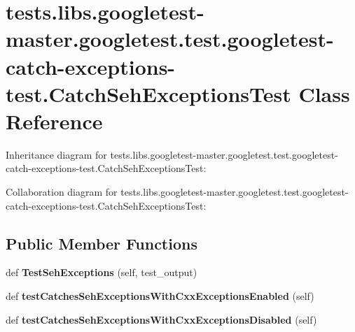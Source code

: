 \hypertarget{classtests_1_1libs_1_1googletest-master_1_1googletest_1_1test_1_1googletest-catch-exceptions-test_1_1CatchSehExceptionsTest}{}\section{tests.\+libs.\+googletest-\/master.googletest.\+test.\+googletest-\/catch-\/exceptions-\/test.Catch\+Seh\+Exceptions\+Test Class Reference}
\label{classtests_1_1libs_1_1googletest-master_1_1googletest_1_1test_1_1googletest-catch-exceptions-test_1_1CatchSehExceptionsTest}


Inheritance diagram for tests.\+libs.\+googletest-\/master.googletest.\+test.\+googletest-\/catch-\/exceptions-\/test.Catch\+Seh\+Exceptions\+Test\+:


Collaboration diagram for tests.\+libs.\+googletest-\/master.googletest.\+test.\+googletest-\/catch-\/exceptions-\/test.Catch\+Seh\+Exceptions\+Test\+:
\subsection*{Public Member Functions}
\begin{DoxyCompactItemize}
\item 
\mbox{\label{classtests_1_1libs_1_1googletest-master_1_1googletest_1_1test_1_1googletest-catch-exceptions-test_1_1CatchSehExceptionsTest_aeee01aa63be2ba2f2c46e4f38e208228}} 
def {\bfseries Test\+Seh\+Exceptions} (self, test\+\_\+output)
\item 
\mbox{\label{classtests_1_1libs_1_1googletest-master_1_1googletest_1_1test_1_1googletest-catch-exceptions-test_1_1CatchSehExceptionsTest_a05d48bdb65f31aa5f41c91854f33f407}} 
def {\bfseries test\+Catches\+Seh\+Exceptions\+With\+Cxx\+Exceptions\+Enabled} (self)
\item 
\mbox{\label{classtests_1_1libs_1_1googletest-master_1_1googletest_1_1test_1_1googletest-catch-exceptions-test_1_1CatchSehExceptionsTest_ac6bb205b2ec96a3956c9d57f52eb5fa6}} 
def {\bfseries test\+Catches\+Seh\+Exceptions\+With\+Cxx\+Exceptions\+Disabled} (self)
\end{DoxyCompactItemize}


